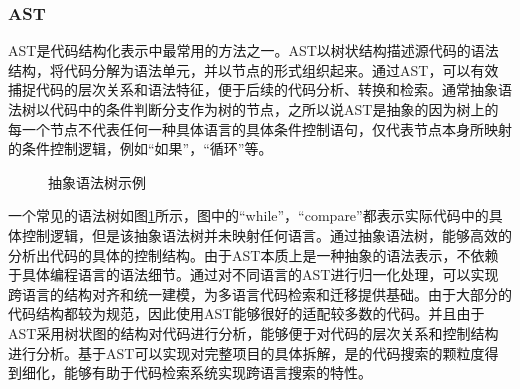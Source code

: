 \documentclass[UTF8,a4paper,12pt]{ctexart}
\numberwithin{equation}{section}
\begin{document}
\subsubsection{AST}
AST是代码结构化表示中最常用的方法之一。AST以树状结构描述源代码的语法结构，将代码分解为语法单元，并以节点的形式组织起来。通过AST，可以有效捕捉代码的层次关系和语法特征，便于后续的代码分析、转换和检索。通常抽象语法树以代码中的条件判断分支作为树的节点，之所以说AST是抽象的因为树上的每一个节点不代表任何一种具体语言的具体条件控制语句，仅代表节点本身所映射的条件控制逻辑，例如“如果”，“循环”等。\par
\begin{figure}[H]
	\caption{抽象语法树示例}
	\label{ast}
\end{figure}
一个常见的语法树如图\ref{ast}所示，图中的“while”，“compare”都表示实际代码中的具体控制逻辑，但是该抽象语法树并未映射任何语言。通过抽象语法树，能够高效的分析出代码的具体的控制结构。由于AST本质上是一种抽象的语法表示，不依赖于具体编程语言的语法细节。通过对不同语言的AST进行归一化处理，可以实现跨语言的结构对齐和统一建模，为多语言代码检索和迁移提供基础。由于大部分的代码结构都较为规范，因此使用AST能够很好的适配较多数的代码。并且由于AST采用树状图的结构对代码进行分析，能够便于对代码的层次关系和控制结构进行分析。基于AST可以实现对完整项目的具体拆解，是的代码搜索的颗粒度得到细化，能够有助于代码检索系统实现跨语言搜索的特性。
\end{document}
